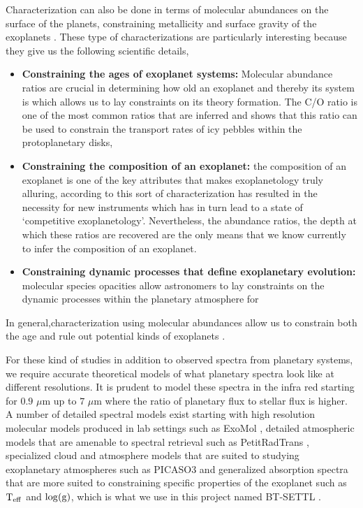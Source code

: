 Characterization can also be done in terms of molecular abundances \cite{2023Wangabund} on the surface of the planets, constraining metallicity and surface gravity of the exoplanets \cite{2023AlemanMetall}.
These type of characterizations are particularly interesting because they give us the following scientific details,
\begin{itemize}
    \item \textbf{Constraining the ages of exoplanet systems:} Molecular abundance ratios are crucial in determining how old an exoplanet and thereby its system is which allows us to lay constraints on its theory formation. The \textsc{C/O} ratio is one of the most common ratios that are inferred and \cite{2021Vandermarel} shows that this ratio can be used to constrain the transport rates of icy pebbles within the protoplanetary disks,
    \item \textbf{Constraining the composition of an exoplanet:} the composition of an exoplanet is one of the key attributes that makes exoplanetology truly alluring, according to \cite{2019Madhsudhan} this sort of characterization has resulted in the necessity for new instruments which has in turn lead to a state of `competitive exoplanetology'. Nevertheless, the abundance ratios, the depth at which these ratios are recovered are the only means that we know currently to infer the composition of an exoplanet. 
    \item \textbf{Constraining dynamic processes that define exoplanetary evolution:} molecular species opacities allow astronomers to lay constraints on the dynamic processes within the planetary atmosphere for \citep[e.g Brown dwarfs]{2020Phillips}
    \end{itemize}
In general,characterization using molecular abundances allow us to constrain both the age and rule out potential kinds of exoplanets \citep[e.g][]{2021Christiaens}.

For these kind of studies in addition to observed spectra from planetary systems, we require accurate theoretical models of what planetary spectra look like at different resolutions.
It is prudent to model these spectra in the infra red starting for $0.9$ $\mu$m up to $7$ $\mu$m where the ratio of planetary flux to stellar flux is higher. 
A number of detailed spectral models exist starting with high resolution molecular models produced in lab settings such as ExoMol \cite{2012Tennyson}, detailed atmospheric models that are amenable to spectral retrieval such as PetitRadTrans \cite{2022Molliere}, specialized cloud and atmosphere models that are suited to studying exoplanetary atmospheres such as PICASO3 \cite{2023Mukherjee} and generalized absorption spectra that are more suited to constraining specific properties of the exoplanet such as $\rm{T_{eff}}$ and $\log(\rm{g})$, which is what we use in this project named BT-SETTL \cite{1997Allard}.

